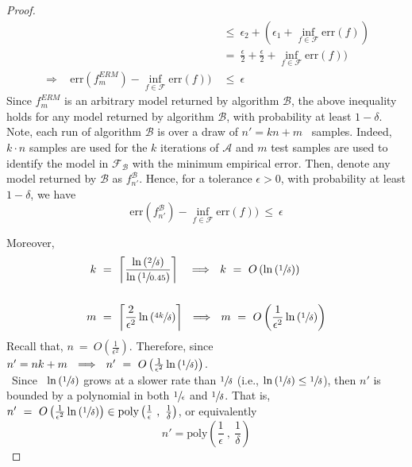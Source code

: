 \documentclass[twoside,11pt]{homework}
\DeclarePairedDelimiter{\2norm}{\lVert}{\rVert^2_2}
\newcommand{\1}[1]{\mathds{1}\left[#1\right]}
\begin{document}
\begin{proof}
\begin{align*}
& \leq \ \epsilon_2 + (\epsilon_1 + \inf_{f \in \mathcal{F}}\text{err}(f)) \\[0.5em]
& = \ \frac{\epsilon}{2} + \frac{\epsilon}{2} + \inf_{f \in \mathcal{F}}\text{err}(f)) \\[0.5em]
\Longrightarrow \ \ \ \ \text{err}(f_m^{ERM}) - \inf_{f \in \mathcal{F}}\text{err}(f)) \ &\leq \ \epsilon
\end{align*}
Since $f_m^{ERM}$ is an arbitrary model returned by algorithm $\mathcal{B}$, the above inequality holds for any model returned by algorithm $\mathcal{B}$, with probability at least $1 - \delta$. Note, each run of algorithm $\mathcal{B}$ is over a draw of $n' = kn + m$ \ samples. Indeed, $k \cdot n$ samples are used for the $k$ iterations of $\mathcal{A}$ and $m$ test samples are used to identify the model in $\mathcal{F}_{\mathcal{B}}$ with the minimum empirical error. Then, denote any model returned by $\mathcal{B}$ as $f_{n'}^{\mathcal{B}}$.  Hence, for a tolerance $\epsilon > 0$, with probability at least $1-\delta$, we have
$$\text{err}(f_{n'}^{\mathcal{B}}) - \inf_{f \in \mathcal{F}}\text{err}(f)) \ \leq \ \epsilon$$

\noindent
Moreover, 
\begin{align*}
k \ &= \ \left\lceil\frac{\ln\left(\sfrac{2}{\delta}\right)}{\ln\left(\sfrac{1}{0.45}\right)}\right\rceil \ \ \ \Longrightarrow \ \ k \ = \ O\left(\ln\left(\sfrac{1}{\delta}\right)\right)\\[1.5em]
m \ &= \ \left\lceil\frac{2}{\epsilon^2}\ln\left(\sfrac{4k}{\delta}\right)\right\rceil \ \ \Longrightarrow \ \ m \ = \ O\left(\frac{1}{\epsilon^2}\ln\left(\sfrac{1}{\delta}\right)\right)
\end{align*}
Recall that, $n \ = \ O\left(\frac{1}{\epsilon^2}\right)$. Therefore, since \ $n' = nk + m \ \ \Longrightarrow \ \ n' \ = \ O\left(\frac{1}{\epsilon^2}\ln\left(\sfrac{1}{\delta}\right)\right)$.\\\
Since \ $\ln\left(\sfrac{1}{\delta}\right)$ grows at a slower rate than $\sfrac{1}{\delta}$ (i.e., $\ln\left(\sfrac{1}{\delta}\right) \leq \sfrac{1}{\delta}$), then $n'$ is bounded by a polynomial in both $\sfrac{1}{\epsilon}$ and $\sfrac{1}{\delta}$. That is, $n' \ = \ O\left(\frac{1}{\epsilon^2}\ln\left(\sfrac{1}{\delta}\right)\right) \in \text{poly}\left(\frac{1}{\epsilon} \ , \ \frac{1}{\delta}\right)$, or equivalently
$$n' = \text{poly}\left(\frac{1}{\epsilon} \ , \ \frac{1}{\delta}\right)$$


\end{proof}
\end{document}
